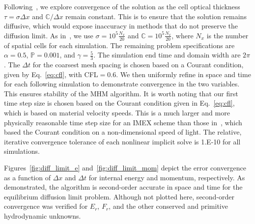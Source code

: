 \documentclass[preprint,12pt]{elsarticle}
\newcommand{\E}{{E_r}}
\newcommand{\F}{{F_r}}
\begin{document}
Following~\cite{mcclarren2}, we explore convergence of the solution as the cell optical thickness $\tau=\sigma \Delta x$ and
$\mathbb{C}/\Delta x$ remain constant.  This is to ensure that the solution remains diffusive, which would expose inaccuracy in methods that
do not preserve the diffusion limit.  As in~\cite{mcclarren2}, we use $\sigma=10^5\frac{N_x}{20}$ and $\mathbb{C}=10^5\frac{N_x}{20}$,
where $N_x$ is the number of spatial cells for each simulation.  The remaining problem specifications are $\alpha=0.5$, $\mathbb{P}=0.001$, 
and ${\gamma=\frac{5}{3}}$.  The simulation end time and domain width are $2\pi$. The $\Delta t$ for the coarsest mesh spacing is
chosen based on a Courant condition, given by Eq.~\eqref{eq:cfl}, with CFL$=0.6$.    We
then uniformly refine in space and time for each following simulation to demonstrate convergence in the two variables. This ensures stability
of the MHM algorithm. It is worth noting that
our first time step size is chosen based on the Courant condition given in Eq.~\eqref{eq:cfl}, which is based on material velocity speeds. 
This is a much larger and more physically reasonable
time step size for an IMEX scheme than those in~\cite{mcclarren2}, which based the
Courant condition on a non-dimensional speed of light.   The relative, iterative
convergence tolerance of each nonlinear implicit solve is 1.E-10 for all simulations.

Figures~\ref{fig:diff_limit_e} and~\ref{fig:diff_limit_mom} depict the error convergence as a function of $\Delta x$ and $\Delta t$ for
internal energy and momentum, respectively.  As demonstrated, the algorithm is second-order accurate in space and time for the equilibrium diffusion limit problem.  Although not plotted here,
second-order convergence
was verified for $\E$, $\F$, and the other conserved and primitive hydrodynamic unknowns.
\end{document}
